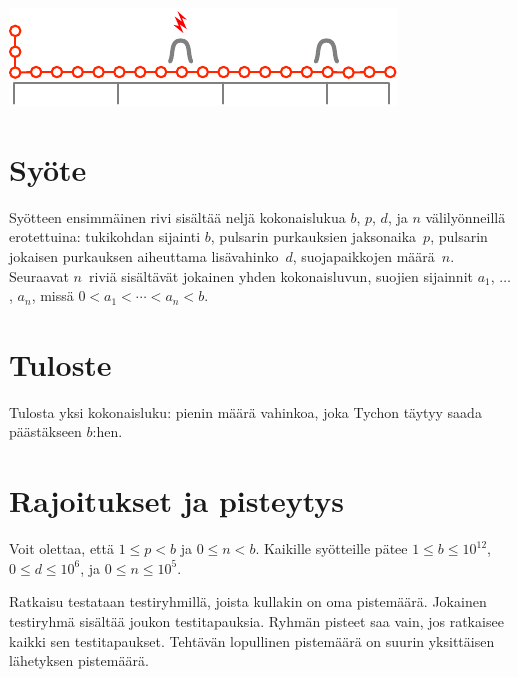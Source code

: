\includegraphics[width=.4\textwidth]{img/sample3.pdf}

\section*{Syöte}

Syötteen ensimmäinen rivi sisältää neljä kokonaislukua $b$, $p$, $d$, ja $n$ 
välilyönneillä erotettuina:
tukikohdan sijainti $b$,
pulsarin purkauksien jaksonaika~$p$,
pulsarin jokaisen purkauksen aiheuttama lisävahinko~$d$,
suojapaikkojen määrä~$n$. 
Seuraavat $n$~riviä sisältävät jokainen yhden kokonaisluvun, 
suojien sijainnit $a_1$, $\ldots$, $a_n$, missä 
$0<a_1<\cdots <a_n< b$. %

\section*{Tuloste}

Tulosta yksi kokonaisluku: pienin määrä vahinkoa, joka Tychon täytyy saada 
päästäkseen $b$:hen. 


\section*{Rajoitukset ja pisteytys}

Voit olettaa, että
$1\leq p < b$ %
ja 
$0\leq n < b$. %
Kaikille syötteille pätee
$1\leq b\leq 10^{12}$, %
$0\leq d \leq 10^6$, %
ja
$0\leq n \leq 10^5$. %

Ratkaisu testataan testiryhmillä, joista kullakin on oma pistemäärä.
Jokainen testiryhmä sisältää joukon testitapauksia.
Ryhmän pisteet saa vain, jos ratkaisee kaikki sen testitapaukset.
Tehtävän lopullinen pistemäärä on suurin yksittäisen lähetyksen pistemäärä.


